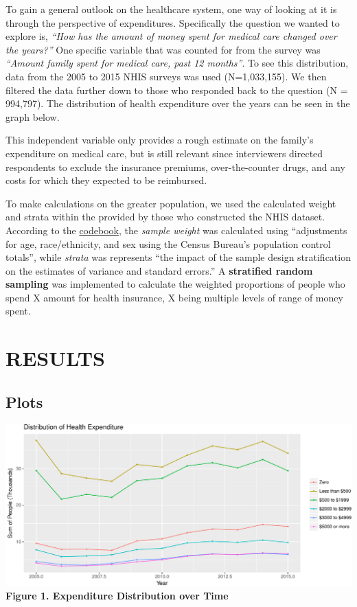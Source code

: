 \documentclass[10pt,]{article}
\makeatletter
\def\maxwidth{\ifdim\Gin@nat@width>\linewidth\linewidth
\else\Gin@nat@width\fi}
\let\Oldincludegraphics\includegraphics
\renewcommand{\includegraphics}[1]{\Oldincludegraphics[width=\maxwidth]{#1}}
\makeatother
\begin{document}
To gain a general outlook on the healthcare system, one way of looking
at it is through the perspective of expenditures. Specifically the
question we wanted to explore is, \emph{``How has the amount of money
spent for medical care changed over the years?''} One specific variable
that was counted for from the survey was \emph{``Amount family spent for
medical care, past 12 months''}. To see this distribution, data from the
2005 to 2015 NHIS surveys was used (N=1,033,155). We then filtered the
data further down to those who responded back to the question (N =
994,797). The distribution of health expenditure over the years can be
seen in the graph below.

This independent variable only provides a rough estimate on the family's
expenditure on medical care, but is still relevant since interviewers
directed respondents to exclude the insurance premiums, over-the-counter
drugs, and any costs for which they expected to be reimbursed.

To make calculations on the greater population, we used the calculated
weight and strata within the provided by those who constructed the NHIS
dataset. According to the \href{https://ihis.ipums.org/}{codebook}, the
\emph{sample weight} was calculated using ``adjustments for age,
race/ethnicity, and sex using the Census Bureau's population control
totals'', while \emph{strata} was represents ``the impact of the sample
design stratification on the estimates of variance and standard
errors.'' A \textbf{stratified random sampling} was implemented to
calculate the weighted proportions of people who spend X amount for
health insurance, X being multiple levels of range of money spent.

\section{RESULTS}\label{results}

\subsection{\texorpdfstring{\textbf{Plots}}{Plots}}\label{plots}

\includegraphics{paper_files/figure-latex/expenddistribution-1.pdf}
\textbf{Figure 1. Expenditure Distribution over Time}
\end{document}
